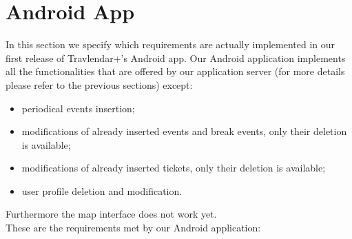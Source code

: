 \section{Android App}
\label{sec:Android App}
In this section we specify which requirements are actually implemented in our first release of Travlendar+'s Android app.
Our Android application implements all the functionalities that are offered by our application server (for more details please refer to the previous sections) except: 
\begin{itemize}
	\item periodical events insertion;
	\item modifications of already inserted events and break events, only their deletion is available;
	\item modifications of already inserted tickets, only their deletion is available;
	\item user profile deletion and modification.
\end{itemize}
Furthermore the map interface does not work yet.\\
\noindent 
These are the requirements met by our Android application:
